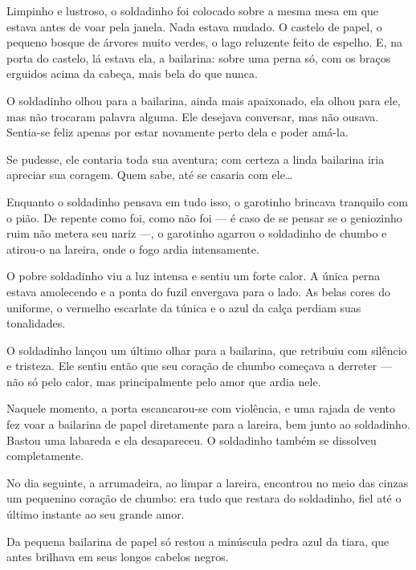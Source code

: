 \begin{conteudo}
\begin{conteudo}
\begin{conteudo}
\begin{conteudo}
\begin{conteudo}
\begin{myquote}
Limpinho e lustroso, o soldadinho foi colocado sobre a mesma mesa em que
estava antes de voar pela janela. Nada estava mudado. O castelo de
papel, o pequeno bosque de árvores muito verdes, o lago reluzente feito
de espelho. E, na porta do castelo, lá estava ela, a bailarina: sobre
uma perna só, com os braços erguidos acima da cabeça, mais bela do que
nunca.

O soldadinho olhou para a bailarina, ainda mais apaixonado, ela olhou
para ele, mas não trocaram palavra alguma. Ele desejava conversar, mas
não ousava. Sentia-se feliz apenas por estar novamente perto dela e
poder amá-la.

Se pudesse, ele contaria toda sua aventura; com certeza a linda
bailarina iria apreciar sua coragem. Quem sabe, até se casaria com
ele\ldots{}

Enquanto o soldadinho pensava em tudo isso, o garotinho brincava
tranquilo com o pião. De repente como foi, como não foi --- é caso de se
pensar se o geniozinho ruim não metera seu nariz ---, o
garotinho agarrou o soldadinho de chumbo e atirou-o na lareira, onde o
fogo ardia intensamente.

O pobre soldadinho viu a luz intensa e sentiu um forte calor. A única
perna estava amolecendo e a ponta do fuzil envergava para o lado. As
belas cores do uniforme, o vermelho escarlate da túnica e o azul da
calça perdiam suas tonalidades.

O soldadinho lançou um último olhar para a bailarina, que retribuiu com
silêncio e tristeza. Ele sentiu então que seu coração de chumbo começava
a derreter --- não só pelo calor, mas principalmente pelo amor que ardia
nele.

Naquele momento, a porta escancarou-se com violência, e uma rajada de
vento fez voar a bailarina de papel diretamente para a lareira, bem
junto ao soldadinho. Bastou uma labareda e ela desapareceu. O soldadinho
também se dissolveu completamente.

No dia seguinte, a arrumadeira, ao limpar a lareira, encontrou no meio
das cinzas um pequenino coração de chumbo: era tudo que restara do
soldadinho, fiel até o último instante ao seu grande amor.

Da pequena bailarina de papel só restou a minúscula pedra azul da tiara,
que antes brilhava em seus longos cabelos negros.

\end{myquote}


\end{conteudo}
\end{conteudo}
\end{conteudo}
\end{conteudo}
\end{conteudo}
